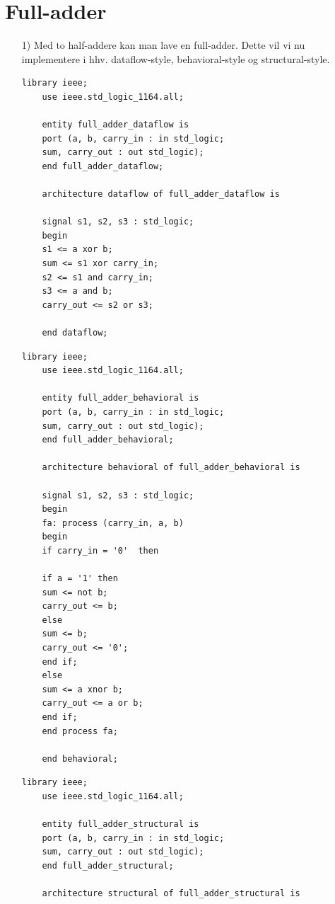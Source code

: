 
\section{Full-adder}
	\flushleft
\begin{enumerate}
	\item[1)]
	Med to half-addere kan man lave en full-adder. Dette vil vi nu implementere i hhv. dataflow-style, behavioral-style og structural-style.\\
	\medskip
	\begin{lstlisting}[caption={Full-adder Dataflow VHDL kode},label={lst:FaDataflowCode}]
	library ieee;
	use ieee.std_logic_1164.all;
	
	entity full_adder_dataflow is
	port (a, b, carry_in : in std_logic;
	sum, carry_out : out std_logic);
	end full_adder_dataflow;
	
	architecture dataflow of full_adder_dataflow is
	
	signal s1, s2, s3 : std_logic;
	begin
	s1 <= a xor b; 
	sum <= s1 xor carry_in;
	s2 <= s1 and carry_in;
	s3 <= a and b;
	carry_out <= s2 or s3;
	
	end dataflow;
	\end{lstlisting}
	\medskip
	\begin{lstlisting}[caption={Full-adder Behavioral VHDL kode}, label={lst:FaBehavioralCode}]
	library ieee;
	use ieee.std_logic_1164.all;
	
	entity full_adder_behavioral is
	port (a, b, carry_in : in std_logic;
	sum, carry_out : out std_logic);
	end full_adder_behavioral;
	
	architecture behavioral of full_adder_behavioral is
	
	signal s1, s2, s3 : std_logic;
	begin
	fa: process (carry_in, a, b)
	begin
	if carry_in = '0'  then
	
	if a = '1' then
	sum <= not b;
	carry_out <= b;
	else
	sum <= b;
	carry_out <= '0';
	end if;
	else 
	sum <= a xnor b;
	carry_out <= a or b;
	end if;
	end process fa;
	
	end behavioral;
	\end{lstlisting}
	\medskip
	\begin{lstlisting}[caption={Full-adder Structural VHDL kode},label={lst:FaStructuralCode}]
	library ieee;
	use ieee.std_logic_1164.all;
	
	entity full_adder_structural is
	port (a, b, carry_in : in std_logic;
	sum, carry_out : out std_logic);
	end full_adder_structural;
	
	architecture structural of full_adder_structural is
	

\end{lstlisting}
\end{enumerate}
